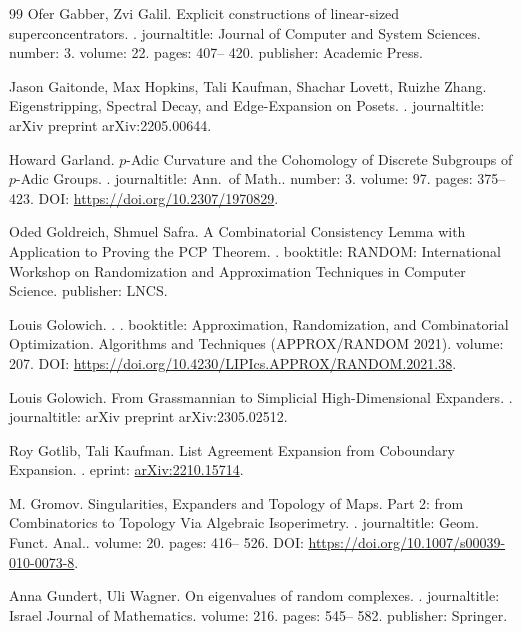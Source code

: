 \documentclass[10pt,a4paper]{article}
\theoremstyle{definition}
\theoremstyle{remark}
\numberwithin{equation}{section}
\begin{document}
\begin{thebibliography}{99}
Ofer Gabber, Zvi Galil.
\newblock Explicit constructions of linear-sized superconcentrators.
.
\newblock journaltitle: Journal of Computer and System Sciences.
\newblock number: 3.
\newblock volume: 22.
\newblock pages: 407-- 420.
\newblock publisher: Academic Press.

Jason Gaitonde, Max Hopkins, Tali Kaufman, Shachar Lovett, Ruizhe Zhang.
\newblock Eigenstripping, Spectral Decay, and Edge-Expansion on Posets.
.
\newblock journaltitle: arXiv preprint arXiv:2205.00644.

Howard Garland.
\newblock $p$-Adic Curvature and the Cohomology of Discrete Subgroups of $p$-Adic Groups.
.
\newblock journaltitle: Ann.\ of Math..
\newblock number: 3.
\newblock volume: 97.
\newblock pages: 375-- 423.
\newblock DOI: \url{https://doi.org/10.2307/1970829}.

Oded Goldreich, Shmuel Safra.
\newblock A Combinatorial Consistency Lemma with Application to Proving the {PCP} Theorem.
.
\newblock booktitle: RANDOM: International Workshop on Randomization and Approximation Techniques in Computer Science.
\newblock publisher: LNCS.

Louis Golowich.
.
.
\newblock booktitle: Approximation, Randomization, and Combinatorial Optimization. Algorithms and Techniques (APPROX/RANDOM 2021).
\newblock volume: 207.
\newblock DOI: \url{https://doi.org/10.4230/LIPIcs.APPROX/RANDOM.2021.38}.

Louis Golowich.
\newblock From Grassmannian to Simplicial High-Dimensional Expanders.
.
\newblock journaltitle: arXiv preprint arXiv:2305.02512.

Roy Gotlib, Tali Kaufman.
\newblock List Agreement Expansion from Coboundary Expansion.
.
\newblock eprint: \url{arXiv:2210.15714}.

M. Gromov.
\newblock Singularities, Expanders and Topology of Maps. Part 2: from Combinatorics to Topology Via Algebraic Isoperimetry.
.
\newblock journaltitle: Geom. Funct. Anal..
\newblock volume: 20.
\newblock pages: 416-- 526.
\newblock DOI: \url{https://doi.org/10.1007/s00039-010-0073-8}.

Anna Gundert, Uli Wagner.
\newblock On eigenvalues of random complexes.
.
\newblock journaltitle: Israel Journal of Mathematics.
\newblock volume: 216.
\newblock pages: 545-- 582.
\newblock publisher: Springer.


\end{thebibliography}
\end{document}
